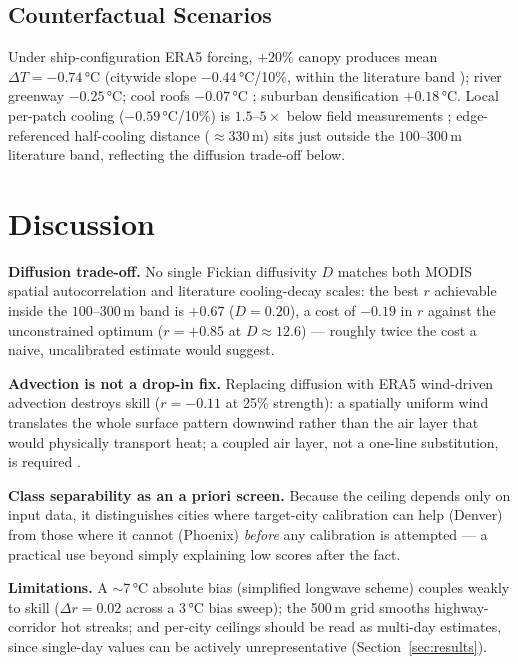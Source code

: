 \documentclass[conference]{IEEEtran}
\begin{document}
\subsection{Counterfactual Scenarios}
Under ship-configuration ERA5 forcing, $+20\%$ canopy produces mean
$\Delta T{=}{-}0.74$\,°C (citywide slope $-0.44$\,°C/10\%, within the
literature band \cite{zhou2025tree, wri2026cooling}); river greenway
$-0.25$\,°C; cool roofs $-0.07$\,°C \cite{santamouris2014cool,
wang2022berlin}; suburban densification $+0.18$\,°C. Local per-patch
cooling ($-0.59$\,°C/10\%) is $1.5$--$5\times$ below field measurements
\cite{krayenhoff2021albedo}; edge-referenced half-cooling distance
($\approx330$\,m) sits just outside the $100$--$300$\,m literature band,
reflecting the diffusion trade-off below.

\section{Discussion}
\label{sec:disc}

\textbf{Diffusion trade-off.} No single Fickian diffusivity $D$ matches
both MODIS spatial autocorrelation and literature cooling-decay scales:
the best $r$ achievable inside the $100$--$300$\,m band is $+0.67$
($D{=}0.20$), a cost of $-0.19$ in $r$ against the unconstrained optimum
($r{=}{+}0.85$ at $D{\approx}12.6$) — roughly twice the cost a naive,
uncalibrated estimate would suggest.

\textbf{Advection is not a drop-in fix.} Replacing diffusion with
ERA5 wind-driven advection destroys skill ($r{=}{-}0.11$ at 25\%
strength): a spatially uniform wind translates the whole surface pattern
downwind rather than the air layer that would physically transport heat;
a coupled air layer, not a one-line substitution, is required
\cite{mitraka2025prototypes}.

\textbf{Class separability as an a priori screen.} Because the ceiling
depends only on input data, it distinguishes cities where target-city
calibration can help (Denver) from those where it cannot (Phoenix)
\emph{before} any calibration is attempted — a practical use beyond
simply explaining low scores after the fact.

\textbf{Limitations.} A $\sim$7\,°C absolute bias (simplified longwave
scheme) couples weakly to skill ($\Delta r{=}0.02$ across a 3\,°C bias
sweep); the 500\,m grid smooths highway-corridor hot streaks; and
per-city ceilings should be read as multi-day estimates, since single-day
values can be actively unrepresentative (Section~\ref{sec:results}).
\end{document}
